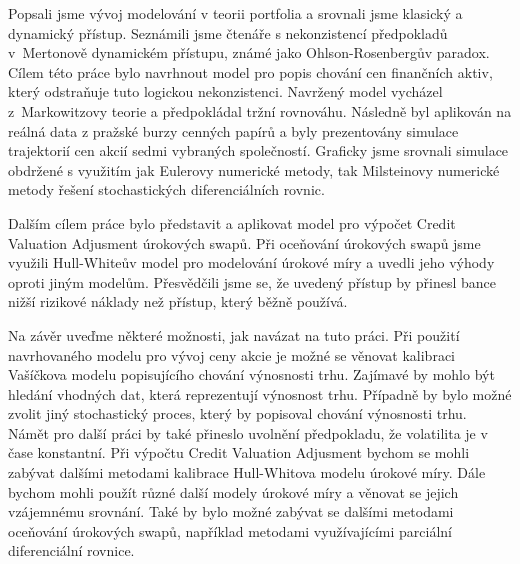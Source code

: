 \documentclass[a4paper,12pt]{report}
\theoremstyle{definition} \newtheorem{definice}[veta]{Definice}
\theoremstyle{remark}
\begin{document}
Popsali jsme vývoj modelování v teorii portfolia a srovnali jsme klasický a dynamický přístup.
Seznámili jsme čtenáře s nekonzistencí předpokladů v~Mertonově dynamickém přístupu, známé jako  Ohlson-Rosenbergův paradox.
Cílem této práce bylo navrhnout model pro popis chování cen finančních aktiv, %
který odstraňuje tuto logickou nekonzistenci.
Navržený model vycházel z~Markowitzovy teorie a předpokládal tržní rovnováhu. 
Následně byl aplikován na reálná data z pražské burzy cenných papírů a byly prezentovány simulace trajektorií cen akcií sedmi vybraných společností.
Graficky jsme srovnali simulace obdržené s využitím jak Eulerovy numerické metody, tak Milsteinovy numerické metody řešení stochastických diferenciálních rovnic.

Dalším cílem práce bylo představit a aplikovat model pro výpočet Credit Valuation Adjusment úrokových swapů.
Při oceňování úrokových swapů jsme využili Hull-Whiteův model pro modelování úrokové míry a uvedli jeho výhody oproti jiným modelům.
Přesvědčili jsme se, že uvedený přístup by přinesl bance nižší rizikové náklady než přístup, který běžně používá.

Na závěr uveďme některé možnosti, jak navázat na tuto práci.
Při použití navrhovaného modelu pro vývoj ceny akcie je možné se věnovat kalibraci Vašíčkova modelu popisujícího chování výnosnosti trhu.
Zajímavé by mohlo být hledání vhodných dat, která reprezentují výnosnost trhu.
Případně by bylo možné zvolit jiný stochastický proces, který by popisoval chování výnosnosti trhu.
%
Námět pro další práci by také přineslo uvolnění předpokladu, že volatilita je v čase konstantní. 
%
Při výpočtu Credit Valuation Adjusment bychom se mohli zabývat dalšími metodami kalibrace Hull-Whitova modelu úrokové míry. 
Dále bychom mohli použít různé další modely úrokové míry a věnovat se jejich vzájemnému srovnání.
Také by bylo možné zabývat se dalšími metodami oceňování úrokových swapů, například metodami využívajícími parciální diferenciální rovnice.

\end{document}
